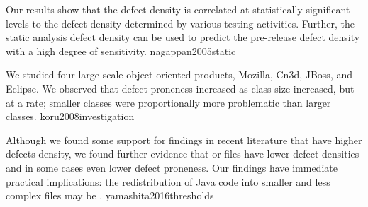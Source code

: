 \documentclass{article}
\begin{document}
  {Our results show that the  defect density is correlated at statistically significant levels to the  defect density determined by various testing activities. Further, the static analysis defect density can be used to predict the pre-release defect density with a high degree of sensitivity.}
  {nagappan2005static}

  {We studied four large-scale object-oriented products, Mozilla, Cn3d, JBoss, and Eclipse. We observed that defect proneness increased as class size increased, but at a  rate; smaller classes were proportionally more problematic than larger classes.}
  {koru2008investigation}

  {Although we found some support for findings in recent literature that  have higher defects density, we found further evidence that  or  files have lower defect densities and in some cases even lower defect proneness. Our findings have immediate practical implications: the redistribution of Java code into smaller and less complex files may be .}
  {yamashita2016thresholds}
\end{document}
